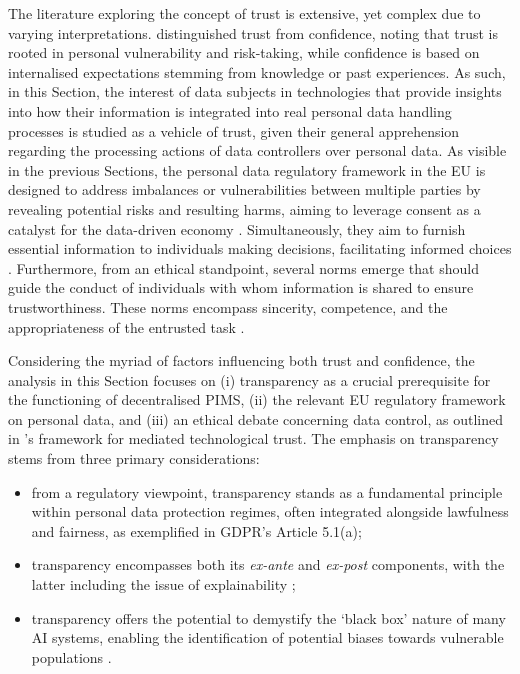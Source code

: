 The literature exploring the concept of trust is extensive, yet complex due to varying interpretations.
\cite{de_filippi_blockchain_2020} distinguished trust from confidence, noting that trust is rooted in personal vulnerability and risk-taking, while confidence is based on internalised expectations stemming from knowledge or past experiences.
As such, in this Section, the interest of data subjects in technologies that provide insights into how their information is integrated into real personal data handling processes is studied as a vehicle of trust, given their general apprehension regarding the processing actions of data controllers over personal data.
As visible in the previous Sections, the personal data regulatory framework in the EU is designed to address imbalances or vulnerabilities between multiple parties by revealing potential risks and resulting harms, aiming to leverage consent as a catalyst for the data-driven economy \citep{chomczyk_penedo_towards_2022}. 
Simultaneously, they aim to furnish essential information to individuals making decisions, facilitating informed choices \cite{benshahar_more_2014}.
Furthermore, from an ethical standpoint, several norms emerge that should guide the conduct of individuals with whom information is shared to ensure trustworthiness.
These norms encompass sincerity, competence, and the appropriateness of the entrusted task \citep{hawley_how_2019}.

Considering the myriad of factors influencing both trust and confidence, the analysis in this Section focuses on (i) transparency as a crucial prerequisite for the functioning of decentralised PIMS, (ii) the relevant EU regulatory framework on personal data, and (iii) an ethical debate concerning data control, as outlined in \citeauthor{bodo_mediated_2021}'s framework for mediated technological trust.
The emphasis on transparency stems from three primary considerations:
\begin{itemize}
    \item from a regulatory viewpoint, transparency stands as a fundamental principle within personal data protection regimes, often integrated alongside lawfulness and fairness, as exemplified in GDPR's Article 5.1(a);
    \item transparency encompasses both its \textit{ex-ante} and \textit{ex-post} components, with the latter including the issue of explainability \citep{felzmann_transparency_2019};
    \item transparency offers the potential to demystify the `black box' nature of many AI systems, enabling the identification of potential biases towards vulnerable populations \citep{pasquale_black_2015}.
\end{itemize}

